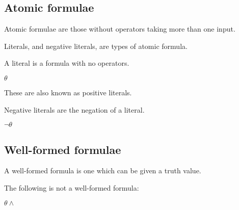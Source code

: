 
\subsection{Atomic formulae}

Atomic formulae are those without operators taking more than one input.

Literals, and negative literals, are types of atomic formula.

A literal is a formula with no operators.

\(\theta \)

These are also known as positive literals.

Negative literals are the negation of a literal.

\(\neg \theta \)

\subsection{Well-formed formulae}

A well-formed formula is one which can be given a truth value.

The following is not a well-formed formula:

$\theta \land $

